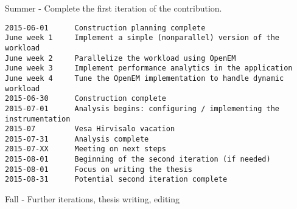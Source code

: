 \begin{samepage}
Summer - Complete the first iteration of the contribution.
\begin{verbatim}
2015-06-01      Construction planning complete
June week 1     Implement a simple (nonparallel) version of the workload
June week 2     Parallelize the workload using OpenEM
June week 3     Implement performance analytics in the application
June week 4     Tune the OpenEM implementation to handle dynamic workload
2015-06-30      Construction complete
2015-07-01      Analysis begins: configuring / implementing the instrumentation
2015-07         Vesa Hirvisalo vacation
2015-07-31      Analysis complete
2015-07-XX      Meeting on next steps
2015-08-01      Beginning of the second iteration (if needed)
2015-08-01      Focus on writing the thesis
2015-08-31      Potential second iteration complete
\end{verbatim}
Fall    - Further iterations, thesis writing, editing
\end{samepage}